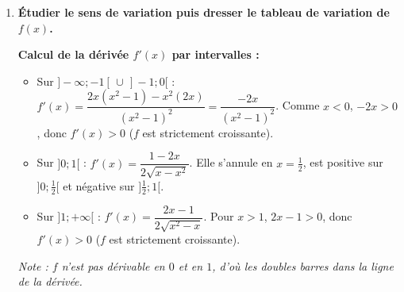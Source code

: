\documentclass[12pt,a4paper]{article}
\begin{document}
\begin{enumerate}
    Pour $x \ge 1$, $f(x) = \sqrt{x^2-x}$. Multiplions par l'expression conjuguée :
    \[ f(x) - \left(x - \frac{1}{2}\right) = \frac{(x^2-x) - \left(x - \frac{1}{2}\right)^2}{\sqrt{x^2-x} + \left(x - \frac{1}{2}\right)} \]
    Or $\left(x - \frac{1}{2}\right)^2 = x^2 - x + \frac{1}{4}$. Le numérateur se simplifie en $-\dfrac{1}{4}$. Ainsi :
    \[ \lim_{x \to +\infty} \left[f(x) - \left(x - \frac{1}{2}\right)\right] = \lim_{x \to +\infty} \frac{-\frac{1}{4}}{\sqrt{x^2-x} + x - \frac{1}{2}} = 0 \]
    La droite $(D) : y = x - \dfrac{1}{2}$ est donc \textbf{asymptote oblique à $(C_f)$ en $+\infty$}.

    \item \textbf{Étudier le sens de variation puis dresser le tableau de variation de $f(x)$.}
    
    \textbf{Calcul de la dérivée $f'(x)$ par intervalles :}
    \begin{itemize}
        \item Sur $]-\infty; -1[ \,\cup\, ]-1; 0[$ : $f'(x) = \dfrac{2x(x^2-1)-x^2(2x)}{(x^2-1)^2} = \dfrac{-2x}{(x^2-1)^2}$. Comme $x < 0$, $-2x > 0$, donc $f'(x) > 0$ ($f$ est strictement croissante).
        \item Sur $]0; 1[$ : $f'(x) = \dfrac{1-2x}{2\sqrt{x-x^2}}$. Elle s'annule en $x = \frac{1}{2}$, est positive sur $]0; \frac{1}{2}[$ et négative sur $]\frac{1}{2}; 1[$.
        \item Sur $]1; +\infty[$ : $f'(x) = \dfrac{2x-1}{2\sqrt{x^2-x}}$. Pour $x > 1$, $2x-1 > 0$, donc $f'(x) > 0$ ($f$ est strictement croissante).
    \end{itemize}
    \textit{Note : $f$ n'est pas dérivable en $0$ et en $1$, d'où les doubles barres dans la ligne de la dérivée.}



\begin{center}
\end{center}   
    
\end{enumerate}
\end{document}
